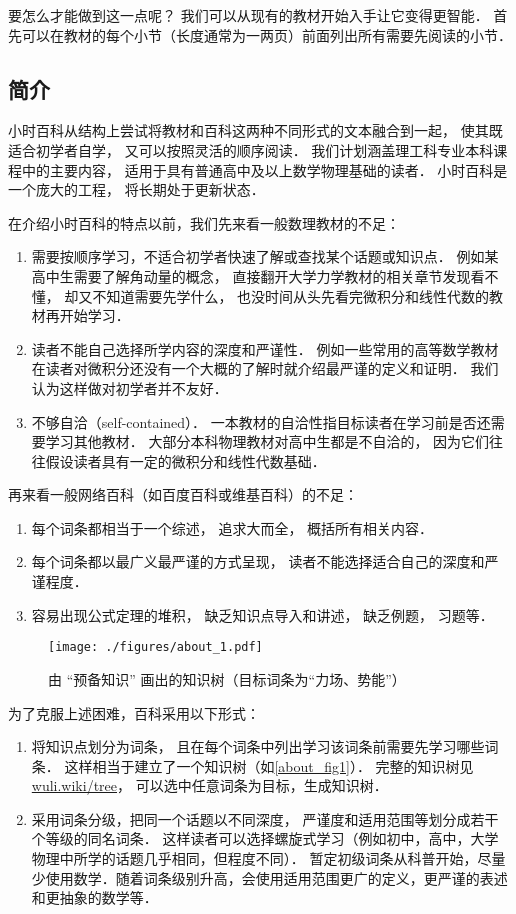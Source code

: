 要怎么才能做到这一点呢？ 我们可以从现有的教材开始入手让它变得更智能． 首先可以在教材的每个小节（长度通常为一两页）前面列出所有需要先阅读的小节．


\subsection{简介}

小时百科从结构上尝试将教材和百科这两种不同形式的文本融合到一起， 使其既适合初学者自学， 又可以按照灵活的顺序阅读． 我们计划涵盖理工科专业本科课程中的主要内容， 适用于具有普通高中及以上数学物理基础的读者． 小时百科是一个庞大的工程， 将长期处于更新状态．

在介绍小时百科的特点以前，我们先来看一般数理教材的不足：
\begin{enumerate}
\item 需要按顺序学习，不适合初学者快速了解或查找某个话题或知识点． 例如某高中生需要了解角动量的概念， 直接翻开大学力学教材的相关章节发现看不懂， 却又不知道需要先学什么， 也没时间从头先看完微积分和线性代数的教材再开始学习．
\item 读者不能自己选择所学内容的深度和严谨性． 例如一些常用的高等数学教材在读者对微积分还没有一个大概的了解时就介绍最严谨的定义和证明． 我们认为这样做对初学者并不友好．
\item 不够自洽（self-contained）． 一本教材的自洽性指目标读者在学习前是否还需要学习其他教材． 大部分本科物理教材对高中生都是不自洽的， 因为它们往往假设读者具有一定的微积分和线性代数基础．
\end{enumerate}

再来看一般网络百科（如百度百科或维基百科）的不足：
\begin{enumerate}
\item 每个词条都相当于一个综述， 追求大而全， 概括所有相关内容．
\item 每个词条都以最广义最严谨的方式呈现， 读者不能选择适合自己的深度和严谨程度．
\item 容易出现公式定理的堆积， 缺乏知识点导入和讲述， 缺乏例题， 习题等．
\end{enumerate}

\begin{figure}[ht]
\centering
\texttt{[image: ./figures/about\_1.pdf]}
\caption{由 “预备知识” 画出的知识树（目标词条为“力场、势能”）}\label{about_fig1}
\end{figure}

为了克服上述困难，百科采用以下形式：
\begin{enumerate}
\item 将知识点划分为词条， 且在每个词条中列出学习该词条前需要先学习哪些词条． 这样相当于建立了一个知识树（如\autoref{about_fig1}）． 完整的知识树见 \href{https://wuli.wiki/tree}{wuli.wiki/tree}， 可以选中任意词条为目标，生成知识树．
\item 采用词条分级，把同一个话题以不同深度， 严谨度和适用范围等划分成若干个等级的同名词条． 这样读者可以选择螺旋式学习（例如初中，高中，大学物理中所学的话题几乎相同，但程度不同）． 暂定初级词条从科普开始，尽量少使用数学．随着词条级别升高，会使用适用范围更广的定义，更严谨的表述和更抽象的数学等．
\end{enumerate}

